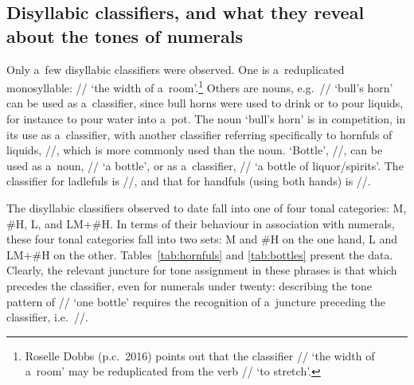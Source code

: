   
\subsection[Disyllabic classifiers]{Disyllabic classifiers, and what they reveal about the tones of numerals}
\label{sec:disyllabicclassifiersandimplicationsforthetonesofnumerals}

Only a~few disyllabic classifiers were observed. One is a~reduplicated {monosyllable}:
// ‘the width of a~room’.\footnote{Roselle Dobbs (p.c.\ 2016) points out that the classifier // ‘the width of a~room’ may be reduplicated from the verb // ‘to stretch’.} Others are nouns, e.g.~// ‘bull’s horn’
can be used as a~classifier, since bull horns were used to drink or to pour liquids, for instance to
pour water into a~pot. The noun ‘bull’s horn’ is in competition, in its use as a~classifier, with
another classifier referring specifically to hornfuls of liquids, //, which is more
commonly used than the noun. 
‘Bottle’, //, can be used as a~noun, // ‘a
bottle’, or as a~classifier, // ‘a bottle of liquor/spirits’. The classifier for
ladlefuls is //, and that for handfuls (using both hands) is //.

The disyllabic classifiers observed to date fall into one of four tonal categories: M, \#H, L, and LM+\#H. In terms of their behaviour in association with numerals, these four tonal categories fall into two sets: M and \#H on the one
hand, L and LM+\#H on the other. Tables~\ref{tab:hornfuls} and \ref{tab:bottles} present the data. Clearly, the relevant juncture for tone assignment in these phrases is that which precedes the classifier, even for numerals under twenty: describing the tone pattern of // ‘one bottle’ requires the recognition of a~juncture preceding the classifier, i.e.\ //.

